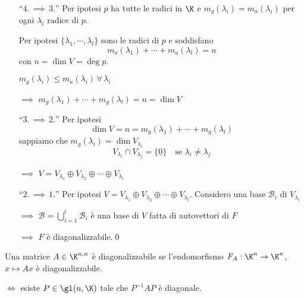 {\begin{itemize}
        $ \{v_{k_1+1}, \cdots, v_{k_1+k_2}\}  $ è una basee di $ V_{\lambda_1}  $ 
        
        $\implies$ $ \dim V_{\lambda_2} =k_2 $ 
        
        $\implies$ $ m_{g}(\lambda_2)=k_2 $

        Si itera il processo per ogni $ \lambda_{i}  $. 
        
        $\implies$ $ m_{a}(\lambda_{i} )= m_{g}(\lambda_{i} )   $ $ \forall\, i =1, \cdots, l $
        \item [``$4. \,\implies\,3.$''] Per ipotesi $ p $ ha tutte le radici in $ \K $ e $ m_{g}(\lambda_i)=m_{a}(\lambda_i)$ per ogni $ \lambda_{i}  $ radice di $ p $.
        
        Per ipotesi $ \{\lambda_1, \cdots, \lambda_{l} \} $ sono le radici di $ p $ e soddisfano \[m_{a}(\lambda_1)+\cdots+m_{a}(\lambda_{l} ) =n  \] con $ n= \dim V=\deg p $.

        $ m_{g}(\lambda_i)\le m_{a}(\lambda_i) \, \forall\, \lambda_i  $ 
        
        $\implies$ $ m_{g}(\lambda_1)+\cdots+ m_{g}(\lambda_{l} )=n=\dim V   $
        \item [``$3. \,\implies\,2.$''] Per ipotesi \[\dim V=n= m_{g}(\lambda_1)+\cdots+ m_{g}(\lambda_{l} )\] sappiamo che $ m_{g}(\lambda_{i})= \dim V_{\lambda_{i} }   $ \[
            V_{\lambda_{i} }\cap V_{\lambda_{j} }=\{\underline{0}\}\quad\text{se } \lambda_{i}\neq \lambda_j      
        \] 
        
        $\implies$ $ V=V_{\lambda_1}\oplus V_{\lambda_2}\oplus \cdots\oplus V_{\lambda_{l} }     $
        \item [``$2. \,\implies\,1.$''] Per ipotesi $ V=V_{\lambda_1}\oplus V_{\lambda_2}\oplus \cdots\oplus V_{\lambda_{l} } $. Considero una base $ \mathscr{B}_i $ di $ V_{\lambda_{i} }$ 
        
        $\implies$ $ \displaystyle\mathscr{B}=\bigcup_{i=1}^{l} \mathscr{B}_i  $ è una base di $ V $ fatta di autovettori di $ F $ 
        
        $\implies$ $ F $ è diagonalizzabile.\qed
    \end{itemize}
}

Una matrice $ A \in \K^{n,n}$ è diagonalizzabile se l'endomorfismo $ F_{A}: \K^{n}\to \K^{n}  $, $ x \mapsto Ax$ è diagonalizzabile.

$ \iff $ esiste $ P \in \gl (n, \K) $ tale che $ P^{-1}AP $ è diagonale.

